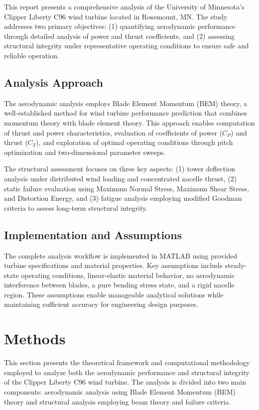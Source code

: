 \documentclass[11pt]{article}
\begin{document}
This report presents a comprehensive analysis of the University of Minnesota's Clipper Liberty C96 wind turbine located in Rosemount, MN. The study addresses two primary objectives: (1) quantifying aerodynamic performance through detailed analysis of power and thrust coefficients, and (2) assessing structural integrity under representative operating conditions to ensure safe and reliable operation.

\subsection{Analysis Approach}

The aerodynamic analysis employs Blade Element Momentum (BEM) theory, a well-established method for wind turbine performance prediction that combines momentum theory with blade element theory. This approach enables computation of thrust and power characteristics, evaluation of coefficients of power ($C_P$) and thrust ($C_T$), and exploration of optimal operating conditions through pitch optimization and two-dimensional parameter sweeps.

The structural assessment focuses on three key aspects: (1) tower deflection analysis under distributed wind loading and concentrated nacelle thrust, (2) static failure evaluation using Maximum Normal Stress, Maximum Shear Stress, and Distortion Energy, and (3) fatigue analysis employing modified Goodman criteria to assess long-term structural integrity.

\subsection{Implementation and Assumptions}

The complete analysis workflow is implemented in MATLAB using provided turbine specifications and material properties. Key assumptions include steady-state operating conditions, linear-elastic material behavior, no aerodynamic interference between blades, a pure bending stress state, and a rigid nacelle region. These assumptions enable manageable analytical solutions while maintaining sufficient accuracy for engineering design purposes.

\section{Methods}

This section presents the theoretical framework and computational methodology employed to analyze both the aerodynamic performance and structural integrity of the Clipper Liberty C96 wind turbine. The analysis is divided into two main components: aerodynamic analysis using Blade Element Momentum (BEM) theory and structural analysis employing beam theory and failure criteria.
\end{document}
